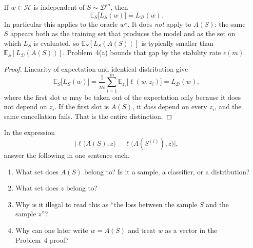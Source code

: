 \begin{proposition}
\label{prop:mlu-unbiased}
If $w\in\mathcal{H}$ is independent of $S\sim\mathcal{D}^m$, then
\[
\mathbb{E}_S\bigl[L_S(w)\bigr]=L_{\mathcal{D}}(w).
\]
In particular this applies to the oracle $w^\star$. It does \emph{not} apply to $A(S)$: the same $S$ appears both as the training set that produces the model and as the set on which $L_S$ is evaluated, so $\mathbb{E}_S[L_S(A(S))]$ is typically smaller than $\mathbb{E}_S[L_{\mathcal{D}}(A(S))]$. Problem~4(a) bounds that gap by the stability rate $\epsilon(m)$.
\end{proposition}

\begin{proof}
Linearity of expectation and identical distribution give
\[
\mathbb{E}_S\bigl[L_S(w)\bigr]
=
\frac1m\sum_{i=1}^m\mathbb{E}_{z_i}\bigl[\ell(w,z_i)\bigr]
=
L_{\mathcal{D}}(w),
\]
where the first slot $w$ may be taken out of the expectation only because it does not depend on $z_i$. If the first slot is $A(S)$, it \emph{does} depend on every $z_i$, and the same cancellation fails. That is the entire distinction.
\end{proof}

\begin{exercise}
\label{ex:mlu-spaces}
In the expression
\[
\bigl\lvert\ell\bigl(A(S),z\bigr)-\ell\bigl(A(S^{(i)}),z\bigr)\bigr\rvert,
\]
answer the following in one sentence each.
\begin{enumerate}[label=(\alph*)]
    \item What set does $A(S)$ belong to? Is it a sample, a classifier, or a distribution?
    \item What set does $z$ belong to?
    \item Why is it illegal to read this as ``the loss between the sample $S$ and the sample $z$''?
    \item Why can one later write $w=A(S)$ and treat $w$ as a vector in the Problem~4 proof?
\end{enumerate}
\end{exercise}

